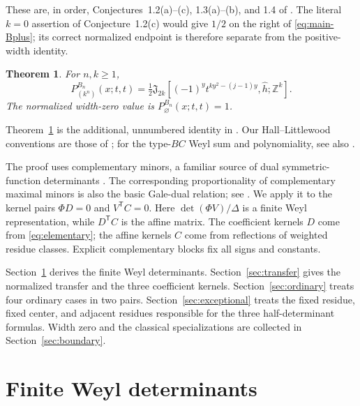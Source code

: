 \documentclass[12pt]{article}
\newtheorem{maintheorem}{Theorem}
\numberwithin{equation}{section}
\newcommand{\Z}{\mathbb Z}
\newcommand{\Jaff}{\mathfrak J}
\begin{document}
These are, in order, Conjectures~1.2(a)--(c), 1.3(a)--(b), and 1.4 of
\cite{Warnaar2026}.  The literal $k=0$ assertion of Conjecture~1.2(c)
would give $1/2$ on the right of \eqref{eq:main-Bplus}; its correct
normalized endpoint is therefore separate from the positive-width
identity.

\begin{maintheorem}\label{thm:B}
For $n,k\ge1$,
\begin{equation}\label{eq:main-Bt}
 P_{(k^n)}^{B_n}(x;t,t)
 =\tfrac12\Jaff_{2k}[(-1)^y t^{ky^2-(j-1)y},\widehat h;\Z^k].
\end{equation}
The normalized width-zero value is $P_{\varnothing}^{B_n}(x;t,t)=1$.
\end{maintheorem}

Theorem~\ref{thm:B} is the additional, unnumbered identity in
\cite[Section~6]{Warnaar2026}.  Our Hall--Littlewood conventions are
those of \cite[(2.16)--(2.17)]{Warnaar2026}; for the type-$BC$ Weyl
sum and polynomiality, see also
\cite[Definition~2.4 and Theorems~2.5--2.6]{Venkateswaran2013}.

The proof uses complementary minors, a familiar source of dual
symmetric-function determinants \cite{Aitken1931,McDowell2023}.
The corresponding proportionality of complementary maximal minors is
also the basic Gale-dual relation; see
\cite[Lemma~2.10]{MullerEtAl2016}.  We apply it to the kernel pairs
$\Phi D=0$ and $V^{\mathsf T}C=0$.
Here $\det(\Phi V)/\Delta$ is a finite Weyl representation, while
$D^{\mathsf T}C$ is the affine matrix.  The coefficient kernels $D$
come from \eqref{eq:elementary}; the affine kernels $C$ come from
reflections of weighted residue classes.  Explicit complementary blocks
fix all signs and constants.

Section~\ref{sec:finite} derives the finite Weyl determinants.
Section~\ref{sec:transfer} gives the normalized transfer and the three
coefficient kernels.  Section~\ref{sec:ordinary} treats four ordinary
cases in two pairs.  Section~\ref{sec:exceptional} treats the fixed
residue, fixed center, and adjacent residues responsible for the three
half-determinant formulas.  Width zero and the classical specializations
are collected in Section~\ref{sec:boundary}.


\section{Finite Weyl determinants}\label{sec:finite}
\end{document}
